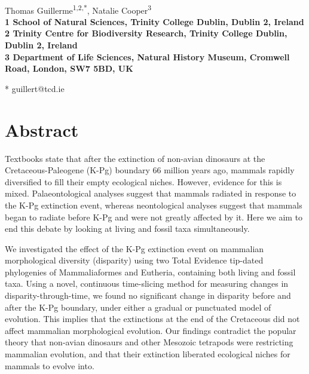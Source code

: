 \documentclass[10pt,letterpaper]{article}
\date{}
\begin{document}
\vspace*{0.35in}

\begin{flushleft}
{\Large
\textbf{}
}
\newline
\\
Thomas Guillerme\textsuperscript{1,2,*},
Natalie Cooper\textsuperscript{3}
\\
\bigskip
\bf{1} School of Natural Sciences, Trinity College Dublin, Dublin 2, Ireland
\\
\bf{2} Trinity Centre for Biodiversity Research, Trinity College Dublin, Dublin 2, Ireland
\\
\bf{3} Department of Life Sciences, Natural History Museum, Cromwell Road, London, SW7 5BD, UK
\\
\bigskip

* guillert@tcd.ie

\end{flushleft}

\section*{Abstract}
Textbooks state that after the extinction of non-avian dinosaurs at the Cretaceous-Paleogene (K-Pg) boundary 66 million years ago, mammals rapidly diversified to fill their empty ecological niches.
However, evidence for this is mixed. 
Palaeontological analyses suggest that mammals radiated in response to the K-Pg extinction event, whereas neontological analyses suggest that mammals began to radiate before K-Pg and were not greatly affected by it. 
Here we aim to end this debate by looking at living and fossil taxa simultaneously.

We investigated the effect of the K-Pg extinction event on mammalian morphological diversity (disparity) using two Total Evidence tip-dated phylogenies of Mammaliaformes and Eutheria, containing both living and fossil taxa. 
Using a novel, continuous time-slicing method for measuring changes in disparity-through-time, we found no significant change in disparity before and after the K-Pg boundary, under either a gradual or punctuated model of evolution.
This implies that the extinctions at the end of the Cretaceous did not affect mammalian morphological evolution. 
Our findings contradict the popular theory that non-avian dinosaurs and other Mesozoic tetrapods were restricting mammalian evolution, and that their extinction liberated ecological niches for mammals to evolve into.
\end{document}
